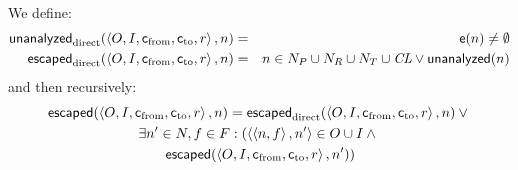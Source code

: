 \documentclass[11pt,notitlepage]{article}
\newcommand{\bigvar}[1]{\ensuremath{\text{\it #1}}}
\newcommand{\func}[1]{\ensuremath{\text{\sffamily #1}}}
\newcommand{\ptgraphA}
           {\tuple{O,I,\func{c}_\text{from},\func{c}_\text{to},r}}
\begin{document}
We define:
\begin{eqnarray*}
\func{unanalyzed}_\text{direct}(\ptgraphA, n) &=&
\func{e}(n)\neq\emptyset
\\
\func{escaped}_\text{direct}(\ptgraphA, n) &=&
 n\in N_P \cup N_R \cup N_T \cup \bigvar{CL}
 \vee
 \func{unanalyzed}(n)
\end{eqnarray*}
and then recursively:
\begin{multline*}
\func{escaped}%
              (\ptgraphA,n) =
 \func{escaped}_\text{direct}(\ptgraphA,n) \vee {}
\\
 \exists n'\in N,f\in F : \left(\tuple{\tuple{n,f},n'}\in O\cup I
 \wedge
{} \right. \\ \left.
 \func{escaped}%
               (\ptgraphA,n')\right)
\end{multline*}

\end{document}
